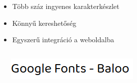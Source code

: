 \begin{frame}
  \begin{itemize}
    \item Több száz ingyenes karakterkészlet
    \item Könnyű kereshetőség
    \item Egyszerű integráció a weboldalba
  \end{itemize}
\end{frame}

\begin{frame}
  \begin{columns}[c]
      \begin{exampleblock}{}
        \scriptsize
        
        
      \end{exampleblock}
      \includegraphics[width=\textwidth]{googleFonts.png}
  \end{columns}
\end{frame}


